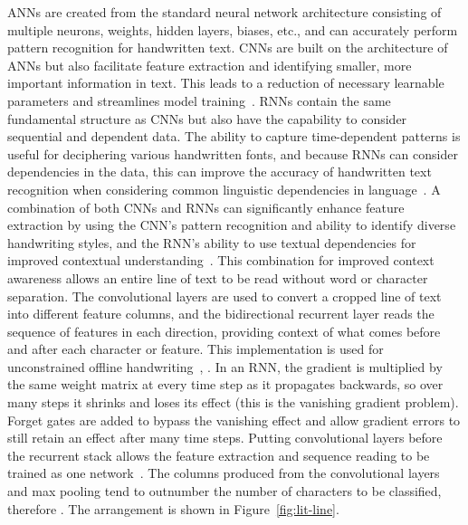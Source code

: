 ANNs are created from the standard neural network architecture consisting of multiple neurons, weights, hidden layers, biases, etc., and can accurately perform pattern recognition for handwritten text. CNNs are built on the architecture of ANNs but also facilitate feature extraction and identifying smaller, more important information in text. This leads to a reduction of necessary learnable parameters and streamlines model training~\cite{ma2023}. RNNs contain the same fundamental structure as CNNs but also have the capability to consider sequential and dependent data. The ability to capture time-dependent patterns is useful for deciphering various handwritten fonts, and because RNNs can consider dependencies in the data, this can improve the accuracy of handwritten text recognition when considering common linguistic dependencies in language~\cite{ma2023}.
A combination of both CNNs and RNNs can significantly enhance feature extraction by using the CNN's pattern recognition and ability to identify diverse handwriting styles, and the RNN's ability to use textual dependencies for improved contextual understanding~\cite{kumar2024}. This combination for improved context awareness allows an entire line of text to be read without word or character separation. The convolutional layers are used to convert a cropped line of text into different feature columns, and the bidirectional recurrent layer reads the sequence of features in each direction, providing context of what comes before and after each character or feature. This implementation is used for unconstrained offline handwriting~\cite{graves2009}, . In an RNN, the gradient is multiplied by the same weight matrix at every time step as it propagates backwards, so over many steps it shrinks and loses its effect (this is the vanishing gradient problem). Forget gates are added to bypass the vanishing effect and allow gradient errors to still retain an effect after many time steps. Putting convolutional layers before the recurrent stack allows the feature extraction and sequence reading to be trained as one network~\cite{shi2017}. The columns produced from the convolutional layers and max pooling tend to outnumber the number of characters to be classified, therefore . The arrangement is shown in Figure~\ref{fig:lit-line}.

